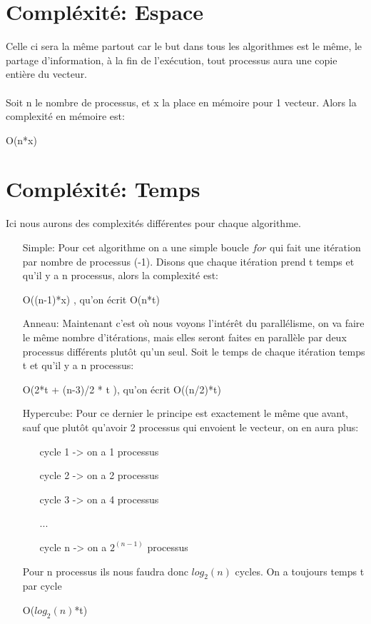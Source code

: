 \documentclass[a4paper]{article}
\begin{document}
\section*{Compléxité: Espace}
Celle ci sera la même partout car le but dans tous les algorithmes est le même, le partage d'information, à la fin de l'exécution, tout processus aura une copie entière du vecteur.\\\\
Soit n le nombre de processus, et x la place en mémoire pour 1 vecteur. Alors la complexité en mémoire est:
\begin{center}
O(n*x) 
\end{center}

\section*{Compléxité: Temps}
Ici nous aurons des complexités différentes pour chaque algorithme.\\
\begin{itemize}
\item[Simple:] Pour cet algorithme on a une simple boucle $for$ qui fait une itération par nombre de processus (-1). Disons que chaque itération prend t temps et qu'il y a n processus, alors la complexité est:  
\begin{center}
O((n-1)*x) , qu'on écrit O(n*t)
\end{center}


\item[Anneau:] Maintenant c'est où nous voyons l'intérêt du parallélisme, on va faire le même nombre d'itérations, mais elles seront faites en parallèle par deux processus différents plutôt qu'un seul. Soit le temps de chaque itération temps t et qu'il y a n processus:  
\begin{center}
O(2*t + (n-3)/2 * t ), qu'on écrit O((n/2)*t) 
\end{center}

\item[Hypercube:] Pour ce dernier le principe est exactement le même que avant, sauf que plutôt qu'avoir 2 processus qui envoient le vecteur, on en aura plus:
\begin{itemize} 
\item[cycle 1 -> ] on a 1 processus
\item[cycle 2 -> ] on a 2 processus
\item[cycle 3 -> ] on a 4 processus
\item[ ... ]
\item[cycle n -> ] on a $2^{(n-1)}$ processus 
\end{itemize} 
Pour n processus ils nous faudra donc $log_{2}(n)$ cycles. On a toujours temps t par cycle
\begin{center}
O($log_{2}(n)$*t) 
\end{center}

\end{itemize}
\end{document}
